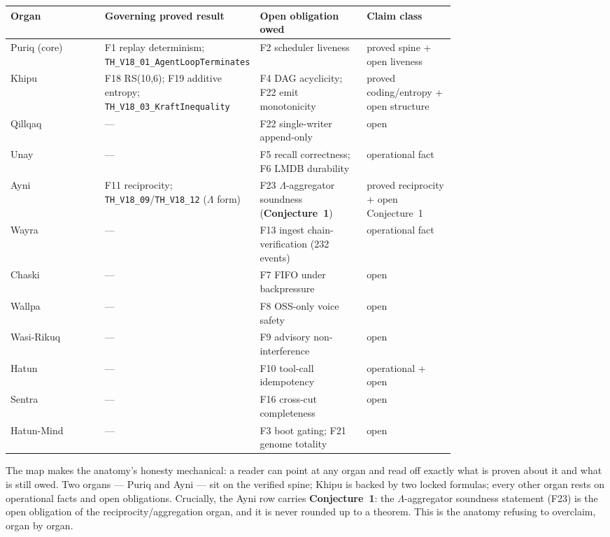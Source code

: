 \documentclass[11pt]{article}
\theoremstyle{plain}
\theoremstyle{definition}
\theoremstyle{remark}
\newcommand{\La}{\Lambda}
\begin{document}
\begin{center}
\begin{longtable}{@{}lp{0.30\linewidth}p{0.24\linewidth}p{0.20\linewidth}@{}}
\toprule
\textbf{Organ} & \textbf{Governing proved result} & \textbf{Open obligation owed} & \textbf{Claim class}\\
\midrule
\endhead
Puriq (core) & F1 replay determinism; \texttt{TH\_V18\_01\_AgentLoopTerminates} & F2 scheduler liveness & proved spine + open liveness\\
Khipu & F18 RS(10,6); F19 additive entropy; \texttt{TH\_V18\_03\_KraftInequality} & F4 DAG acyclicity; F22 emit monotonicity & proved coding/entropy + open structure\\
Qillqaq & --- & F22 single-writer append-only & open\\
Unay & --- & F5 recall correctness; F6 LMDB durability & operational fact\\
Ayni & F11 reciprocity; \texttt{TH\_V18\_09}/\texttt{TH\_V18\_12} ($\La$ form) & F23 $\La$-aggregator soundness (\textbf{Conjecture~1}) & proved reciprocity + open Conjecture~1\\
Wayra & --- & F13 ingest chain-verification (232 events) & operational fact\\
Chaski & --- & F7 FIFO under backpressure & open\\
Wallpa & --- & F8 OSS-only voice safety & open\\
Wasi-Rikuq & --- & F9 advisory non-interference & open\\
Hatun & --- & F10 tool-call idempotency & operational + open\\
Sentra & --- & F16 cross-cut completeness & open\\
Hatun-Mind & --- & F3 boot gating; F21 genome totality & open\\
\bottomrule
\end{longtable}
\end{center}

The map makes the anatomy's honesty mechanical: a reader can point at any organ and read
off exactly what is proven about it and what is still owed. Two organs --- Puriq and Ayni
--- sit on the verified spine; Khipu is backed by two locked formulas; every other organ
rests on operational facts and open obligations. Crucially, the Ayni row carries
\textbf{Conjecture~1}: the $\La$-aggregator soundness statement (F23) is the open
obligation of the reciprocity/aggregation organ, and it is never rounded up to a theorem.
This is the anatomy refusing to overclaim, organ by organ.
\end{document}
